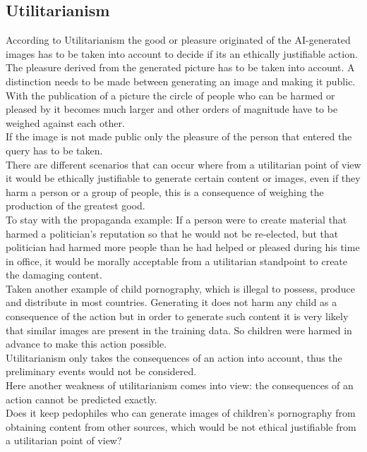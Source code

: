 \documentclass[9pt,twocolumn,twoside]{osajnl}
\begin{document}
\subsection{Utilitarianism}
According to Utilitarianism the good or pleasure originated of the AI-generated images has to be taken into account to decide if its an ethically justifiable action. \\
The pleasure derived from the generated picture has to be taken into account.
A distinction needs to be made between generating an image and making it public. With the publication of a picture the circle of people who can be harmed or pleased by it becomes much larger and other orders of magnitude have to be weighed against each other.\\
If the image is not made public only the pleasure of the person that entered the query has to be taken. \\
There are different scenarios that can occur where from a utilitarian point of view it would be ethically justifiable to generate certain content or images, even if they harm a person or a group of people, this is a consequence of weighing the production of the greatest good. \\
To stay with the propaganda example: If a person were to create material that harmed a politician's reputation so that he would not be re-elected, but that politician had harmed more people than he had helped or pleased during his time in office, it would be morally acceptable from a utilitarian standpoint to create the damaging content.\\
Taken another example of child pornography, which is illegal to possess, produce and distribute in most countries. Generating it does not harm any child as a consequence of the action but in order to generate such content it is very likely that similar images are present in the training data. So children were harmed in advance to make this action possible.\\ Utilitarianism only takes the consequences of an action into account, thus the preliminary events would not be considered. \\
Here another weakness of utilitarianism comes into view: the consequences of an action cannot be predicted exactly.\\
Does it keep pedophiles who can generate images of children's pornography from obtaining content from other sources, which would be not ethical justifiable from a utilitarian point of view?
\end{document}

